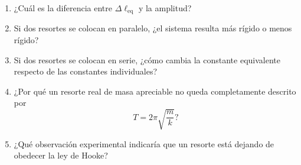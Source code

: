 \begin{enumerate}
    \item ¿Cuál es la diferencia entre \(\Delta\ell_{\mathrm{eq}}\) y la amplitud?

    \item Si dos resortes se colocan en paralelo, ¿el sistema resulta más rígido o menos rígido?

    \item Si dos resortes se colocan en serie, ¿cómo cambia la constante equivalente respecto de las constantes individuales?

    \item ¿Por qué un resorte real de masa apreciable no queda completamente descrito por
    \[ T=2\pi\sqrt{\frac{m}{k}}? \]

    \item ¿Qué observación experimental indicaría que un resorte está dejando de obedecer la ley de Hooke?
\end{enumerate}



